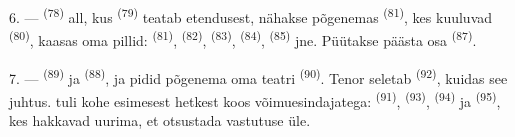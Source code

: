 6. ---  \textsuperscript{(78)} all, kus 
\textsuperscript{(79)} teatab etendusest, nähakse põgenemas 
\textsuperscript{(81)}, kes kuuluvad  \textsuperscript{(80)}, kaasas
oma pillid:  \textsuperscript{(81)},  \textsuperscript{(82)},
 \textsuperscript{(83)},  \textsuperscript{(84)},
 \textsuperscript{(85)} jne. Püütakse päästa osa 
\textsuperscript{(87)}.

7. ---  \textsuperscript{(89)} ja 
\textsuperscript{(88)},  ja  pidid põgenema oma
teatri \textsuperscript{(90)}. Tenor seletab
 \textsuperscript{(92)}, kuidas see juhtus. 
tuli kohe esimesest hetkest koos võimuesindajatega: 
\textsuperscript{(91)},  \textsuperscript{(93)},
 \textsuperscript{(94)} ja 
\textsuperscript{(95)}, kes hakkavad uurima, et otsustada vastutuse üle.

\VUsaut{6.0mm}
\VUfilet{22mm}
